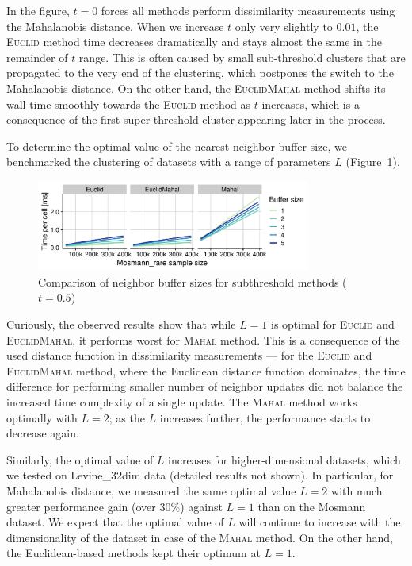 In the figure, $t=0$ forces all methods perform dissimilarity measurements using the Mahalanobis distance. When we increase $t$ only very slightly to $0.01$, the \textsc{Euclid} method time decreases dramatically and stays almost the same in the remainder of $t$ range. This is often caused by small sub-threshold clusters that are propagated to the very end of the clustering, which postpones the switch to the Mahalanobis distance. On the other hand, the \textsc{EuclidMahal} method shifts its wall time smoothly towards the \textsc{Euclid} method as $t$ increases, which is a consequence of the first super-threshold cluster appearing later in the process.

To determine the optimal value of the nearest neighbor buffer size, we benchmarked the clustering of datasets with a range of parameters $L$ (Figure~\ref{fig:perf_nei}).

\begin{figure}[t]
	\centering
	\includegraphics[width=9cm]{Mahalanobis/img/neighbors.pdf}
	\caption{Comparison of neighbor buffer sizes for subthreshold methods ($t=0.5$)}
	\label{fig:perf_nei}
\end{figure}

Curiously, the observed results show that while $L=1$ is optimal for \textsc{Euclid} and \textsc{EuclidMahal}, it performs worst for \textsc{Mahal} method. This is a consequence of the used distance function in dissimilarity measurements --- for the \textsc{Euclid} and \textsc{EuclidMahal} method, where the Euclidean distance function dominates, the time difference for performing smaller number of neighbor updates did not balance the increased time complexity of a single update. The \textsc{Mahal} method works optimally with $L=2$; as the $L$ increases further, the performance starts to decrease again. 

Similarly, the optimal value of $L$ increases for higher-dimensional datasets, which we tested on Levine\_32dim data (detailed results not shown). In particular, for Mahalanobis distance, we measured the same optimal value $L=2$ with much greater performance gain (over $30\%$) against $L=1$ than on the Mosmann dataset. We expect that the optimal value of $L$ will continue to increase with the dimensionality of the dataset in case of the \textsc{Mahal} method. On the other hand, the Euclidean-based methods kept their optimum at $L=1$.

